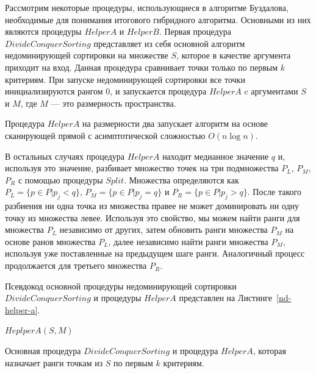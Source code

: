 Рассмотрим некоторые процедуры, использующиеся в алгоритме Буздалова, необходимые для понимания итогового гибридного алгоритма. Основными из них являются процедуры $HelperA$ и $HelperB$. Первая процедура $DivideConquerSorting$ представляет из себя основной алгоритм недоминирующей сортировки на множестве $S$, которое в качестве аргумента приходит на вход. Данная процедура сравнивает точки только по первым $k$ критериям. При запуске недоминирующей сортировки все точки инициализируются рангом $0$, и запускается процедура $HelperA$ c аргументами $S$ и $M$, где $M$ {---} это размерность пространства.


Процедура $HelperA$ на размерности два запускает алгоритм на основе сканирующей прямой с асимптотической сложностью $O(n \log n)$.

В остальных случаях процедура $HelperA$ находит медианное значение $q$ и, используя это значение, разбивает множество точек на три подмножества $P_L$, $P_M$, $P_R$ с помощью процедуры $Split$. Множества определяются как $P_L = \{p \in P | p_j < q\}$, $P_M = \{p \in P | p_j = q\}$ и $P_R = \{p \in P | p_j > q\}$. После такого разбиения ни одна точка из множества правее не может доминировать ни одну точку из множества левее. Используя это свойство, мы можем найти ранги для множества $P_L$ независимо от других, затем обновить ранги множества $P_M$ на основе ранов множества $P_L$, далее независимо найти ранги множества $P_M$, используя уже поставленные на предыдущем шаге ранги. Аналогичный процесс продолжается для третьего множества $P_R$.

Псевдокод основной процедуры недоминирующей сортировки $DivideConquerSorting$ и процедуры $HelperA$ представлен на Листинге~\ref{nd-helper-a}.

\begin{algorithm}
\begin{algorithmic}[1]
    \State $HeplperA(S, M)$
\EndProcedure
{}
     \Return
    \Else
    \EndIf
\EndProcedure
\end{algorithmic}
\caption{Основная процедура \textsc{$DivideConquerSorting$} и процедура \textsc{$HelperA$}, которая назначает ранги точкам из $S$ по первым $k$ критериям.}
\label{nd-helper-a}
\end{algorithm}

